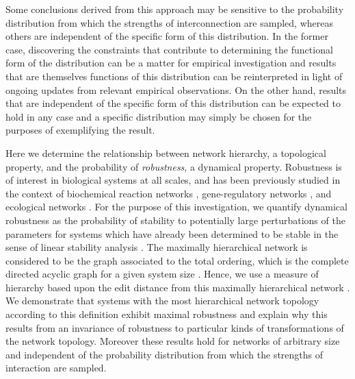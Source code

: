 Some conclusions derived from this approach may be sensitive to the probability distribution from which the strengths of interconnection are sampled, whereas others are independent of the specific form of this distribution. In the former case, discovering the constraints that contribute to determining the functional form of the distribution can be a matter for empirical investigation and results that are themselves functions of this distribution can be reinterpreted in light of ongoing updates from relevant empirical observations. On the other hand, results that are independent of the specific form of this distribution can be expected to hold in any case and a specific distribution may simply be chosen for the purposes of exemplifying the result.


Here we determine the relationship between network hierarchy, a topological property, and the probability of \emph{robustness}, a dynamical property. Robustness is of interest in biological systems at all scales, and has been previously studied in the context of biochemical reaction networks \cite{Shinar2010}, gene-regulatory networks \cite{VanNimwegen1999,Siegal2002,Wagner2013}, and ecological networks \cite{Rohr2014}. For the purpose of this investigation, we quantify dynamical robustness as the probability of stability to potentially large perturbations of the parameters for systems which have already been determined to be stable in the sense of linear stability analysis \cite{Davis1962}. The maximally hierarchical network is considered to be the graph associated to the total ordering, which is the complete directed acyclic graph for a given system size \cite{Cormen2009}. Hence, we use a measure of hierarchy based upon the edit distance from this maximally hierarchical network \cite{Axenovich2011}. We demonstrate that systems with the most hierarchical network topology according to this definition exhibit maximal robustness and explain why this results from an invariance of robustness to particular kinds of transformations of the network topology. Moreover these results hold for networks of arbitrary size and independent of the probability distribution from which the strengths of interaction are sampled.
